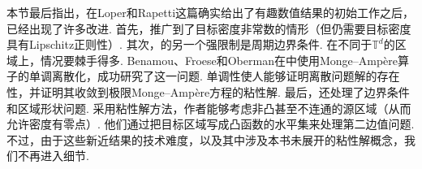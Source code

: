 本节最后指出，在Loper和Rapetti这篇确实给出了有趣数值结果的初始工作之后，已经出现了许多改进. 首先，\cite{b280}推广到了目标密度非常数的情形（但仍需要目标密度具有Lipschitz正则性）. 其次，\cite{b217}的另一个强限制是周期边界条件. 在不同于$\mathbb T^d$的区域上，情况要棘手得多. Benamou、Froese和Oberman在\cite{b39,b41}中使用Monge--Ampère算子的单调离散化，成功研究了这一问题. 单调性使人能够证明离散问题解的存在性，并证明其收敛到极限Monge--Ampère方程的粘性解. 最后，\cite{b39,b41}还处理了边界条件和区域形状问题. 采用粘性解方法，作者能够考虑非凸甚至不连通的源区域（从而允许密度有零点）. \label{idx:i136-p235}
他们通过把目标区域写成凸函数的水平集来处理第二边值问题. 不过，由于这些新近结果的技术难度，以及其中涉及本书未展开的粘性解概念，我们不再进入细节.

